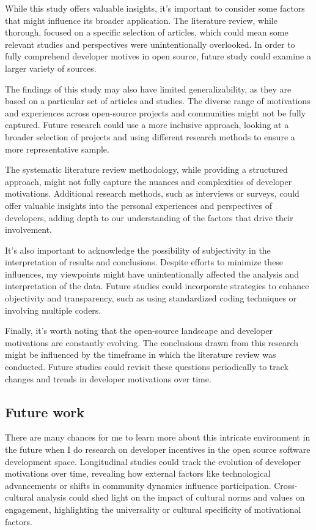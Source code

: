 While this study offers valuable insights, it's important to consider some factors that might influence its broader application. The literature review, while thorough, focused on a specific selection of articles, which could mean some relevant studies and perspectives were unintentionally overlooked. In order to fully comprehend developer motives in open source, future study could examine a larger variety of sources.


The findings of this study may also have limited generalizability, as they are based on a particular set of articles and studies. The diverse range of motivations and experiences across open-source projects and communities might not be fully captured. Future research could use a more inclusive approach, looking at a broader selection of projects and using different research methods to ensure a more representative sample.

The systematic literature review methodology, while providing a structured approach, might not fully capture the nuances and complexities of developer motivations. Additional research methods, such as interviews or surveys, could offer valuable insights into the personal experiences and perspectives of developers, adding depth to our understanding of the factors that drive their involvement.

It's also important to acknowledge the possibility of subjectivity in the interpretation of results and conclusions. Despite efforts to minimize these influences, my viewpoints might have unintentionally affected the analysis and interpretation of the data. Future studies could incorporate strategies to enhance objectivity and transparency, such as using standardized coding techniques or involving multiple coders.

Finally, it's worth noting that the open-source landscape and developer motivations are constantly evolving. The conclusions drawn from this research might be influenced by the timeframe in which the literature review was conducted. Future studies could revisit these questions periodically to track changes and trends in developer motivations over time.


\subsection{Future work}

There are many chances for me to learn more about this intricate environment in the future when I do research on developer incentives in the open source software development space. Longitudinal studies could track the evolution of developer motivations over time, revealing how external factors like technological advancements or shifts in community dynamics influence participation.  Cross-cultural analysis could shed light on the impact of cultural norms and values on engagement, highlighting the universality or cultural specificity of motivational factors.

